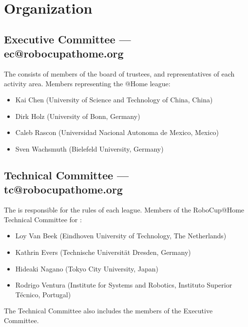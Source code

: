 \section{Organization}

\subsection{Executive Committee --- ec@robocupathome.org}
\label{sec:ec}
The  consists of members of the board of trustees, and representatives of each activity area. Members representing the @Home league:
\begin{itemize}
  \item Kai Chen (University of Science and Technology of China, China)
  \item Dirk Holz (University of Bonn, Germany)
  \item Caleb Rascon (Universidad Nacional Autonoma de Mexico, Mexico)
  \item Sven Wachsmuth (Bielefeld University, Germany)
\end{itemize}

\subsection{Technical Committee --- tc@robocupathome.org}
\label{sec:tc}
The  is responsible for the rules of each league. Members of the RoboCup@Home Technical Committee for \YEAR:
\begin{itemize}
  \item Loy Van Beek (Eindhoven University of Technology, The Netherlands)
  \item Kathrin Evers (Technische Universit{\"a}t Dresden, Germany)
  \item Hideaki Nagano (Tokyo City University, Japan)
  \item Rodrigo Ventura (Institute for Systems and Robotics, Instituto Superior T{\'e}cnico, Portugal)
\end{itemize}
The Technical Committee also includes the members of the Executive Committee.

